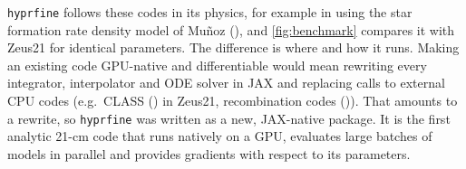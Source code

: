 \documentclass[
]{article}
\begin{document}
\texttt{hyprfine} follows these codes in its physics, for example in
using the star formation rate density model of Muñoz
(), and \autoref{fig:benchmark}
compares it with Zeus21 for identical parameters. The difference is
where and how it runs. Making an existing code GPU-native and
differentiable would mean rewriting every integrator, interpolator and
ODE solver in JAX and replacing calls to external CPU codes (e.g.~CLASS
() in Zeus21,
recombination codes ()). That amounts to a rewrite, so \texttt{hyprfine} was written as
a new, JAX-native package. It is the first analytic 21-cm code that runs
natively on a GPU, evaluates large batches of models in parallel and
provides gradients with respect to its parameters.
\end{document}
